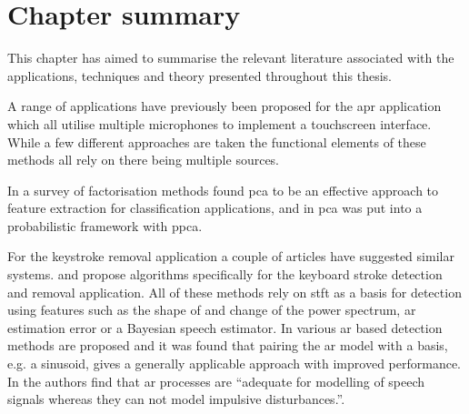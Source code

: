 %






\section{Chapter summary}
This chapter has aimed to summarise the relevant literature associated with the applications, techniques and theory presented throughout this thesis.

A range of applications have previously been proposed for the \gls{apr} application which all utilise multiple microphones to implement a touchscreen interface\cite{US8174547}\linebreak[0]\cite{US8233353}\linebreak[0]\cite{TouchSystems2006}\cite{US7411581}\cite{WO2006108443}. While a few different approaches are taken the functional elements of these methods all rely on there being multiple sources.

In \cite{Burke2013} a survey of factorisation methods found \gls{pca} to be an effective approach to feature extraction for classification applications, and in \cite{Tipping1999} \gls{pca} was put into a probabilistic framework with \gls{ppca}.

For the keystroke removal application a couple of articles have suggested similar systems\cite{Subramanya2007}\cite{Sugiyama2007}\cite{Abramson2007}. \cite{Subramanya2007} and \cite{Sugiyama2007} propose algorithms specifically for the keyboard stroke detection and removal application. All of these methods rely on \gls{stft} as a basis for detection using features such as the shape of and change of the power spectrum\cite{Sugiyama2007}, \gls{ar} estimation error\cite{Subramanya2007}\cite{Kauppinen2002} or a Bayesian speech estimator\cite{Abramson2007}. In \cite{Godsill1998book} various \gls{ar} based detection methods are proposed and it was found that pairing the \gls{ar} model with a basis, e.g. a sinusoid, gives a generally applicable approach with improved performance. In \cite{Vaseghi1990} the authors find that \gls{ar} processes are ``adequate for modelling of speech signals whereas they can not model impulsive disturbances.''.

